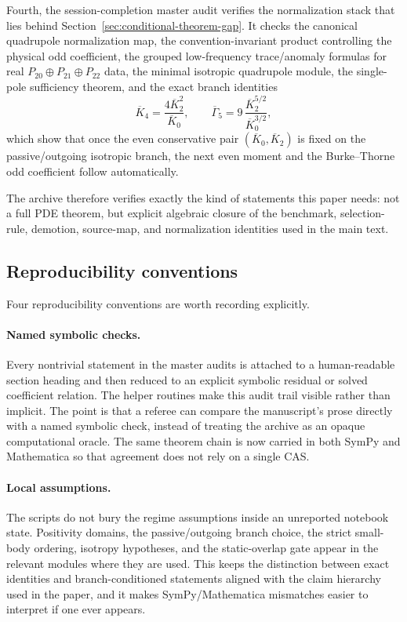\documentclass[11pt]{article}
\begin{document}
Fourth, the session-completion master audit verifies the normalization stack that
lies behind Section~\ref{sec:conditional-theorem-gap}.  It checks the canonical
quadrupole normalization map, the convention-invariant product controlling the
physical odd coefficient, the grouped low-frequency trace/anomaly formulas for
real $P_{20}\oplus P_{21}\oplus P_{22}$ data, the minimal isotropic quadrupole
module, the single-pole sufficiency theorem, and the exact branch identities
\[
\overline K_4=\frac{4\overline K_2^2}{\overline K_0},
\qquad
\overline\Gamma_5
=9\,\frac{\overline K_2^{5/2}}{\overline K_0^{3/2}},
\]
which show that once the even conservative pair
\((\overline K_0,\overline K_2)\) is fixed on the passive/outgoing isotropic
branch, the next even moment and the Burke--Thorne odd coefficient follow
automatically.

The archive therefore verifies exactly the kind of statements this paper needs:
not a full PDE theorem, but explicit algebraic closure of the benchmark,
selection-rule, demotion, source-map, and normalization identities used in the
main text.

\subsection{Reproducibility conventions}
\label{sec:verification-conventions}

Four reproducibility conventions are worth recording explicitly.

\paragraph{Named symbolic checks.}
Every nontrivial statement in the master audits is attached to a human-readable
section heading and then reduced to an explicit symbolic residual or solved
coefficient relation.  The helper routines make this audit trail visible rather
than implicit.  The point is that a referee can compare the manuscript's prose
directly with a named symbolic check, instead of treating the archive as an
opaque computational oracle.  The same theorem chain is now carried in both
SymPy and Mathematica so that agreement does not rely on a single CAS.

\paragraph{Local assumptions.}
The scripts do not bury the regime assumptions inside an unreported notebook
state.  Positivity domains, the passive/outgoing branch choice, the strict
small-body ordering, isotropy hypotheses, and the static-overlap gate appear in
the relevant modules where they are used.  This keeps the distinction between
exact identities and branch-conditioned statements aligned with the claim
hierarchy used in the paper, and it makes SymPy/Mathematica mismatches easier
to interpret if one ever appears.
\end{document}
